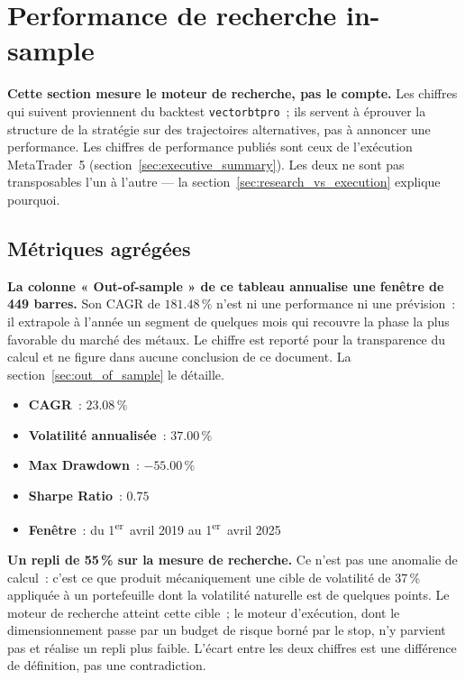 \section{Performance de recherche in-sample}
\label{sec:is_results}

\begin{warningbox}
\textbf{Cette section mesure le moteur de recherche, pas le compte.} Les chiffres qui suivent proviennent du backtest \texttt{vectorbtpro}~; ils servent à éprouver la structure de la stratégie sur des trajectoires alternatives, pas à annoncer une performance. Les chiffres de performance publiés sont ceux de l'exécution MetaTrader~5 (section~\ref{sec:executive_summary}). Les deux ne sont pas transposables l'un à l'autre --- la section~\ref{sec:research_vs_execution} explique pourquoi.
\end{warningbox}

\subsection{Métriques agrégées}



\begin{warningbox}
\textbf{La colonne « Out-of-sample » de ce tableau annualise une fenêtre de 449 barres.}
Son CAGR de $181.48\,\%$ n'est ni une performance ni une prévision~: il extrapole à l'année
un segment de quelques mois qui recouvre la phase la plus favorable du marché des métaux.
Le chiffre est reporté pour la transparence du calcul et ne figure dans aucune conclusion
de ce document. La section~\ref{sec:out_of_sample} le détaille.
\end{warningbox}



\begin{itemize}
\item \textbf{CAGR}~: $23.08\,\%$
\item \textbf{Volatilité annualisée}~: $37.00\,\%$
\item \textbf{Max Drawdown}~: $-55.00\,\%$
\item \textbf{Sharpe Ratio}~: $0.75$
\item \textbf{Fenêtre}~: du 1\textsuperscript{er}~avril 2019 au 1\textsuperscript{er}~avril 2025
\end{itemize}

\begin{insightbox}
\textbf{Un repli de 55\,\% sur la mesure de recherche.} Ce n'est pas une anomalie de calcul~: c'est ce que produit mécaniquement une cible de volatilité de 37\,\% appliquée à un portefeuille dont la volatilité naturelle est de quelques points. Le moteur de recherche atteint cette cible~; le moteur d'exécution, dont le dimensionnement passe par un budget de risque borné par le stop, n'y parvient pas et réalise un repli plus faible. L'écart entre les deux chiffres est une différence de définition, pas une contradiction.
\end{insightbox}

